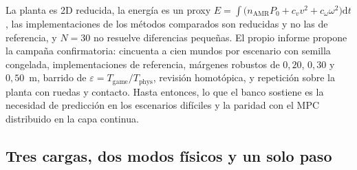 \begin{observacion}
\label{obs:ensayo-r10-alcance}
La planta es 2D reducida, la energía es un proxy
$E=\int\bigl(n_{\mathrm{AMR}}P_0+c_vv^2+c_\omega\omega^2\bigr)\mathrm dt$, las
implementaciones de los métodos comparados son reducidas y no las de
referencia, y $N=30$ no resuelve diferencias pequeñas. El propio informe
propone la campaña confirmatoria: cincuenta a cien mundos por escenario con
semilla congelada, implementaciones de referencia, márgenes robustos de
$0{,}20$, $0{,}30$ y $0{,}50$~m, barrido de $\varepsilon=T_{\mathrm{game}}/T_{\mathrm{phys}}$,
revisión homotópica, y repetición sobre la planta con ruedas y contacto.
Hasta entonces, lo que el banco sostiene es la necesidad de predicción en los
escenarios difíciles y la paridad con el MPC distribuido en la capa continua.
\end{observacion}

\subsection{Tres cargas, dos modos físicos y un solo paso}

